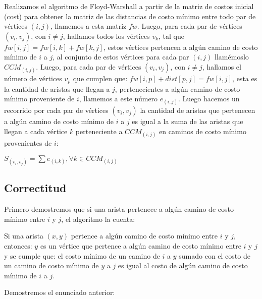 \documentclass[article]{llncs}
\begin{document}
Realizamos el algoritmo de Floyd-Warshall a partir de la matriz de costos inicial (cost) para obtener la matriz de las distancias de costo mínimo entre todo par de vértices $(i,j)$, llamemos a esta matriz $fw$.
Luego, para cada par de vértices $(v_i,v_j)$, con $i \neq j$, hallamos todos los vértices $v_k$, tal que $fw[i,j] = fw[i,k] + fw[k,j]$, estos vértices pertencen a algún
camino de costo mínimo de $i$ a $j$, al conjunto de estos vértices para cada par $(i,j)$ llamémoslo $CCM_(i,j)$. Luego, para cada par de vértices $(v_i,v_j)$, con $i \neq j$, hallamos el número de vértices $v_p$ que cumplen que:
$fw[i,p] + dist[p,j] = fw[i,j]$, esta es la cantidad de aristas que llegan a $j$, pertenecientes a algún camino de costo mínimo proveniente de $i$, llamemos a este número $e_(i,j)$.
Luego hacemos un recorrido por cada par de vértices $(v_i,v_j)$ la cantidad de aristas que pertenecen a algún camino de costo mínimo de $i$ a $j$ es igual a la suma de las aristas que llegan a cada vértice $k$ perteneciente a $CCM_(i,j)$ en caminos de costo
mínimo provenientes de $i$:

$S_(v_i,v_j) = \sum e_(i,k), \forall k\in CCM_(i,j) $

\subsection{Correctitud}
Primero demostremos que si una arista pertenece a algún camino de costo mínimo entre $i$ y $j$, el algoritmo la cuenta:

Si una arista $(x,y)$ pertence a algún camino de costo mínimo entre $i$ y $j$, entonces: $y$ es un vértice que pertence a algún camino de costo mínimo entre $i$ y $j$ y se cumple que: 
el costo mínimo de un camino de $i$ a $y$ sumado con el costo de un camino de costo mínimo de $y$ a $j$ es igual al costo de algún camino de costo mínimo de $i$ a $j$.

Demostremos el enunciado anterior:
\end{document}
